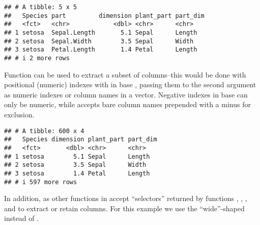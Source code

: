 \documentclass[krantz2]{krantz}\usepackage{knitr}
\begin{document}
\begin{knitrout}\footnotesize
{}\color{fgcolor}\begin{kframe}
\begin{alltt}
 \hlopt{:}\hlstd{)}
\end{alltt}
\begin{verbatim}
## # A tibble: 5 x 5
##   Species part         dimension plant_part part_dim
##   <fct>   <chr>            <dbl> <chr>      <chr>   
## 1 setosa  Sepal.Length       5.1 Sepal      Length  
## 2 setosa  Sepal.Width        3.5 Sepal      Width   
## 3 setosa  Petal.Length       1.4 Petal      Length  
## # i 2 more rows
\end{verbatim}
\end{kframe}
\end{knitrout}

Function  can be used to extract a subset of columns--this would be done with positional (numeric) indexes with \code{[ , ]} in base \Rlang, passing them to the second argument as numeric indexes or column names in a vector. Negative indexes in base \Rlang can only be numeric, while  accepts bare column names prepended with a minus for exclusion.

\begin{knitrout}\footnotesize
{}\color{fgcolor}\begin{kframe}
\begin{alltt}
 \hlopt{-}
\end{alltt}
\begin{verbatim}
## # A tibble: 600 x 4
##   Species dimension plant_part part_dim
##   <fct>       <dbl> <chr>      <chr>   
## 1 setosa        5.1 Sepal      Length  
## 2 setosa        3.5 Sepal      Width   
## 3 setosa        1.4 Petal      Length  
## # i 597 more rows
\end{verbatim}
\end{kframe}
\end{knitrout}

In addition,  as other functions in  accept ``selectors'' returned by functions , , , and  to extract or retain columns. For this example we use the ``wide''-shaped  instead of .
\end{document}
